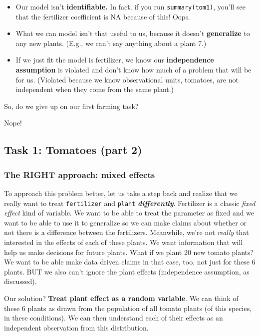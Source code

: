 \documentclass[
  openany]{book}
\providecommand{\tightlist}{%
  \setlength{\itemsep}{0pt}\setlength{\parskip}{0pt}}
\begin{document}
\begin{itemize}
\tightlist
\item
  Our model isn't \textbf{identifiable.} In fact, if you run \texttt{summary(tom1)}, you'll see that the fertilizer coefficient is NA because of this! Oops.
\item
  What we can model isn't that useful to us, because it doesn't \textbf{generalize} to any new plants. (E.g., we can't say anything about a plant 7.)
\item
  If we just fit the model is fertilizer, we know our \textbf{independence assumption} is violated and don't know how much of a problem that will be for us. (Violated because we know observational units, tomatoes, are not independent when they come from the same plant.)
\end{itemize}

So, do we give up on our first farming task?

Nope!

\hypertarget{task-1-tomatoes-part-2}{%
\subsection{Task 1: Tomatoes (part 2)}\label{task-1-tomatoes-part-2}}

\hypertarget{the-right-approach-mixed-effects}{%
\subsubsection{The RIGHT approach: mixed effects}\label{the-right-approach-mixed-effects}}

To approach this problem better, let us take a step back and realize that we really want to treat \texttt{fertilizer} and \texttt{plant} \textbf{\emph{differently}}. Fertilizer is a classic \emph{fixed effect} kind of variable. We want to be able to treat the parameter as fixed and we want to be able to use it to generalize so we can make claims about whether or not there is a difference between the fertilizers. Meanwhile, we're not \emph{really} that interested in the effects of each of these plants. We want information that will help us make decisions for future plants. What if we plant 20 new tomato plants? We want to be able make data driven claims in that case, too, not just for these 6 plants. BUT we also can't ignore the plant effects (independence assumption, as discussed).

Our solution? \textbf{Treat plant effect as a random variable}. We can think of these 6 plants as drawn from the population of all tomato plants (of this species, in these conditions). We can then understand each of their effects as an independent observation from this distribution.
\end{document}
